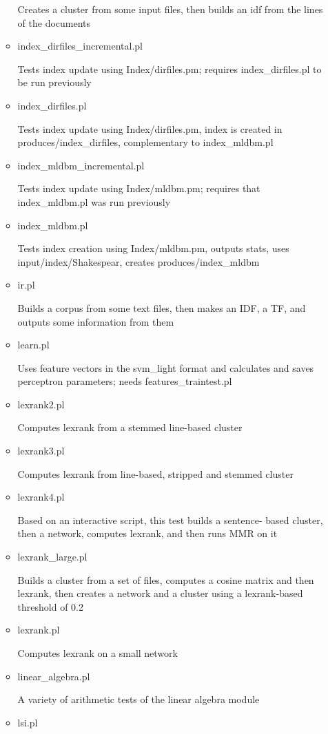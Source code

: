 \begin{itemize}
\begin{itemize}
 Creates a cluster from some input files, then builds an idf
 from the lines of the documents 
  \item index\_dirfiles\_incremental.pl

 Tests index update using Index/dirfiles.pm; requires
 index\_dirfiles.pl to be run previously
  \item index\_dirfiles.pl

 Tests index update using Index/dirfiles.pm, index is created
 in produces/index\_dirfiles, complementary to index\_mldbm.pl
  \item index\_mldbm\_incremental.pl

 Tests index update using Index/mldbm.pm; requires that
 index\_mldbm.pl was run previously
  \item index\_mldbm.pl

 Tests index creation using Index/mldbm.pm, outputs stats,
 uses input/index/Shakespear, creates produces/index\_mldbm
  \item ir.pl

 Builds a corpus from some text files, then makes an IDF, a
 TF, and outputs some information from them
  \item learn.pl

 Uses feature vectors in the svm\_light format and calculates
 and saves perceptron parameters; needs features\_traintest.pl
  \item lexrank2.pl

 Computes lexrank from a stemmed line-based cluster
  \item lexrank3.pl

 Computes lexrank from line-based, stripped and stemmed
 cluster
  \item lexrank4.pl

 Based on an interactive script, this test builds a sentence-
 based cluster, then a network, computes lexrank, and then
 runs MMR on it 
  \item lexrank\_large.pl

 Builds a cluster from a set of files, computes a cosine matrix
 and then lexrank, then creates a network and a cluster using
 a lexrank-based threshold of 0.2
  \item lexrank.pl

 Computes lexrank on a small network
  \item linear\_algebra.pl

 A variety of arithmetic tests of the linear algebra module 
  \item lsi.pl


\end{itemize}
\end{itemize}
